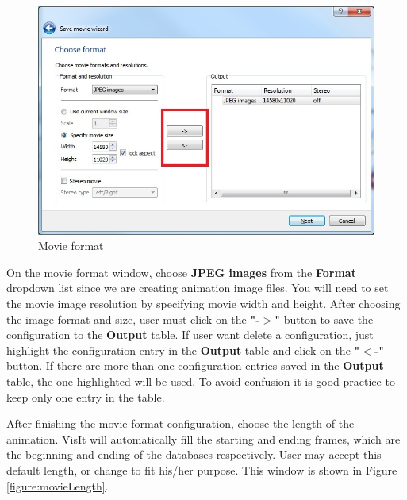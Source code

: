 \documentclass[12pt]{report}
\begin{document}
				\begin{figure}
        \begin{center}
        \includegraphics[scale=0.75]{movieFormat}
        \caption{Movie format}
        \label{figure:movieFormat}
        \end{center}
        \end{figure}
		    
On the movie format window, choose {\bf JPEG images} from the {\bf Format} dropdown list 
since we are creating animation image files. You will need to set the movie image 
resolution by specifying movie width and height. After choosing the image format and
size, user must click on the {\bf "-$>$"} button to save the configuration to the {\bf Output} table. If user want delete a 
configuration, just highlight the configuration entry in the {\bf Output} table and click on the {\bf "$<$-"} button. If there are more than one configuration entries saved in the {\bf Output} table, the one highlighted will be used. To avoid confusion it is good practice to keep only one entry in the table.
				
After finishing the movie format configuration, choose the length of the animation. VisIt will automatically fill the starting and ending frames, which are the beginning and ending of the databases respectively. 
User may accept this default length, or change to fit
his/her purpose.  This window is shown in Figure \ref{figure:movieLength}.
				
\end{document}
